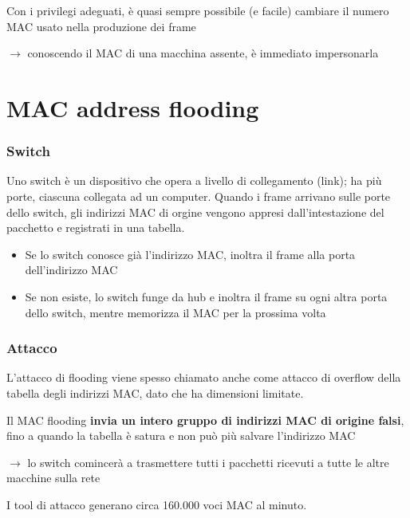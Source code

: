 \noindent Con i privilegi adeguati, è quasi sempre possibile (e facile) cambiare il numero 
MAC usato nella produzione dei frame

$\rightarrow$ conoscendo il MAC di una macchina assente, è immediato impersonarla

\newpage
\section{MAC address flooding}
\subsubsection{Switch}
Uno switch è un dispositivo che opera a livello di collegamento (link); ha più porte, ciascuna 
collegata ad un computer.
\noindent Quando i frame arrivano sulle porte dello switch, gli indirizzi MAC di orgine vengono 
appresi dall'intestazione del pacchetto e registrati in una tabella.
\begin{itemize}
    \item Se lo switch conosce già l'indirizzo MAC, inoltra il frame alla porta dell'indirizzo MAC 
    \item Se non esiste, lo switch funge da hub e inoltra il frame su ogni altra porta dello switch, mentre 
    memorizza il MAC per la prossima volta
\end{itemize}

\subsubsection{Attacco}
\noindent L'attacco di flooding viene spesso chiamato anche come attacco di overflow della 
tabella degli indirizzi MAC, dato che ha dimensioni limitate.

\noindent Il MAC flooding \textbf{invia un intero gruppo di indirizzi MAC di origine falsi}, fino 
a quando la tabella è satura e non può più salvare l'indirizzo MAC

$\rightarrow$ lo switch comincerà a trasmettere tutti i pacchetti ricevuti a tutte le altre macchine 
sulla rete 

\noindent I tool di attacco generano circa 160.000 voci MAC al minuto.

